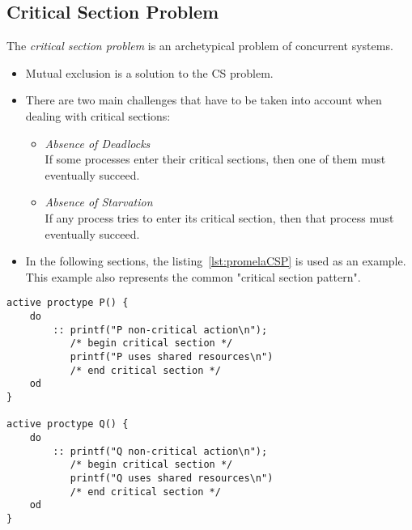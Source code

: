 	\subsection{Critical Section Problem}
		The \textit{critical section problem} is an archetypical problem of concurrent systems.




		\begin{itemize}
			\item Mutual exclusion is a solution to the CS problem.
			\item There are two main challenges that have to be taken into account when dealing with critical sections:
				\begin{itemize}
					\item \textit{Absence of Deadlocks} \\ If some processes enter their critical sections, then one of them must eventually succeed.
					\item \textit{Absence of Starvation} \\ If any process tries to enter its critical section, then that process must eventually succeed.
				\end{itemize}
			\item In the following sections, the listing~\ref{lst:promelaCSP} is used as an example. This example also represents the common "critical section pattern".
		\end{itemize}

		\begin{lstlisting}[caption = { Critical Section Pattern in PROMELA }, label = lst:promelaCSP, language = PROMELA]
active proctype P() {
	do
		:: printf("P non-critical action\n");
		   /* begin critical section */
		   printf("P uses shared resources\n")
		   /* end critical section */
	od
}

active proctype Q() {
	do
		:: printf("Q non-critical action\n");
		   /* begin critical section */
		   printf("Q uses shared resources\n")
		   /* end critical section */
	od
}
			\end{lstlisting}

